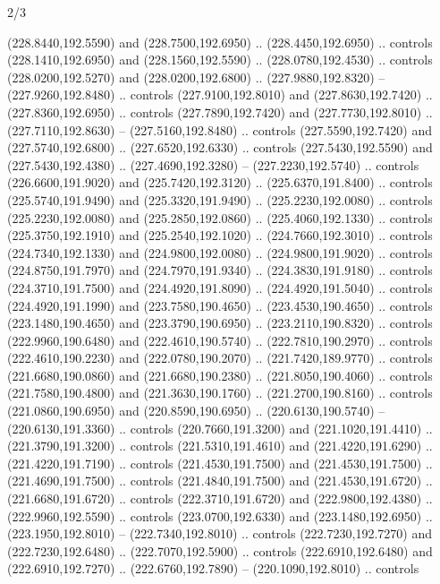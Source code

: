\begin{flagdescription}{2/3}
\begin{scope}[xshift=0.5\flaglength,yshift=0.5\flagwidth,scale=\flagwidth/259.2]
\begin{scope}[y=0.8pt, x=0.8pt, yscale=-1,shift={(-243,-162)}]
      (228.8440,192.5590) and (228.7500,192.6950) .. (228.4450,192.6950) .. controls
      (228.1410,192.6950) and (228.1560,192.5590) .. (228.0780,192.4530) .. controls
      (228.0200,192.5270) and (228.0200,192.6800) .. (227.9880,192.8320) --
      (227.9260,192.8480) .. controls (227.9100,192.8010) and (227.8630,192.7420) ..
      (227.8360,192.6950) .. controls (227.7890,192.7420) and (227.7730,192.8010) ..
      (227.7110,192.8630) -- (227.5160,192.8480) .. controls (227.5590,192.7420) and
      (227.5740,192.6800) .. (227.6520,192.6330) .. controls (227.5430,192.5590) and
      (227.5430,192.4380) .. (227.4690,192.3280) -- (227.2230,192.5740) .. controls
      (226.6600,191.9020) and (225.7420,192.3120) .. (225.6370,191.8400) .. controls
      (225.5740,191.9490) and (225.3320,191.9490) .. (225.2230,192.0080) .. controls
      (225.2230,192.0080) and (225.2850,192.0860) .. (225.4060,192.1330) .. controls
      (225.3750,192.1910) and (225.2540,192.1020) .. (224.7660,192.3010) .. controls
      (224.7340,192.1330) and (224.9800,192.0080) .. (224.9800,191.9020) .. controls
      (224.8750,191.7970) and (224.7970,191.9340) .. (224.3830,191.9180) .. controls
      (224.3710,191.7500) and (224.4920,191.8090) .. (224.4920,191.5040) .. controls
      (224.4920,191.1990) and (223.7580,190.4650) .. (223.4530,190.4650) .. controls
      (223.1480,190.4650) and (223.3790,190.6950) .. (223.2110,190.8320) .. controls
      (222.9960,190.6480) and (222.4610,190.5740) .. (222.7810,190.2970) .. controls
      (222.4610,190.2230) and (222.0780,190.2070) .. (221.7420,189.9770) .. controls
      (221.6680,190.0860) and (221.6680,190.2380) .. (221.8050,190.4060) .. controls
      (221.7580,190.4800) and (221.3630,190.1760) .. (221.2700,190.8160) .. controls
      (221.0860,190.6950) and (220.8590,190.6950) .. (220.6130,190.5740) --
      (220.6130,191.3360) .. controls (220.7660,191.3200) and (221.1020,191.4410) ..
      (221.3790,191.3200) .. controls (221.5310,191.4610) and (221.4220,191.6290) ..
      (221.4220,191.7190) .. controls (221.4530,191.7500) and (221.4530,191.7500) ..
      (221.4690,191.7500) .. controls (221.4840,191.7500) and (221.4530,191.6720) ..
      (221.6680,191.6720) .. controls (222.3710,191.6720) and (222.9800,192.4380) ..
      (222.9960,192.5590) .. controls (223.0700,192.6330) and (223.1480,192.6950) ..
      (223.1950,192.8010) -- (222.7340,192.8010) .. controls (222.7230,192.7270) and
      (222.7230,192.6480) .. (222.7070,192.5900) .. controls (222.6910,192.6480) and
      (222.6910,192.7270) .. (222.6760,192.7890) -- (220.1090,192.8010) .. controls

\end{scope}
\end{scope}
\end{flagdescription}
